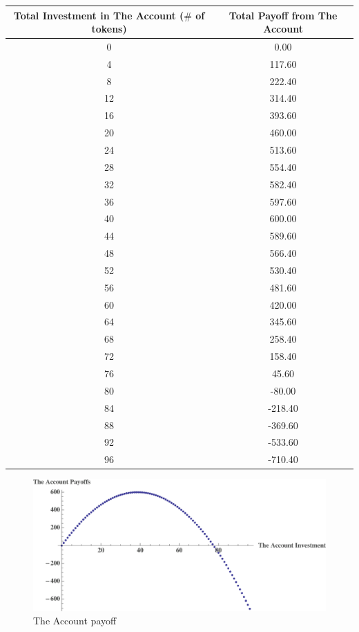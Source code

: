 \documentclass[12pt]{article}
\begin{document}
\begin{table}[H]
\centering
\setlength{\tabcolsep}{15pt}
\begin{tabular}{cc}
 {\bf Total Investment in The Account ($\#$ of tokens)} & {\bf Total Payoff from The Account} \\
\toprule
 0 & 0.00 \\[0.5ex]
 4 & 117.60 \\[0.5ex]
 8 & 222.40 \\[0.5ex]
 12 & 314.40 \\[0.5ex]
 16 & 393.60 \\[0.5ex]
 20 & 460.00 \\[0.5ex]
 24 & 513.60 \\[0.5ex]
 28 & 554.40 \\[0.5ex]
 32 & 582.40 \\[0.5ex]
 36 & 597.60 \\[0.5ex]
 40 & 600.00 \\[0.5ex]
 44 & 589.60 \\[0.5ex]
 48 & 566.40 \\[0.5ex]
 52 & 530.40 \\[0.5ex]
 56 & 481.60 \\[0.5ex]
 60 & 420.00 \\[0.5ex]
 64 & 345.60 \\[0.5ex]
 68 & 258.40 \\[0.5ex]
 72 & 158.40 \\[0.5ex]
 76 & 45.60 \\[0.5ex]
 80 & -80.00 \\[0.5ex]
 84 & -218.40 \\[0.5ex]
 88 & -369.60\\[0.5ex]
 92 & -533.60 \\[0.5ex]
 96 & -710.40 \\
\bottomrule
\end{tabular}
\end{table}



\iffalse

\newpage

\begin{landscape}

\begin{figure}[c]
\centering
\includegraphics[width=50pc]{instructionsplot}
\caption{The Account payoff}
\end{figure}

\end{landscape}
\end{document}
